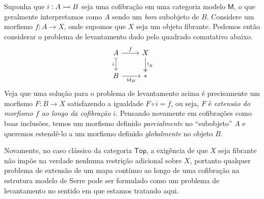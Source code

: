 \begin{exem}
  \label{exem:extensao_ao_longo_de_cofibracao_como_levantamento}
  Suponha que $i: A \rightarrowtail B$ seja uma cofibração em uma categoria modelo $\mathsf{M}$, o que geralmente interpretamos como $A$ sendo um \emph{bom} subobjeto de $B$.
  Considere um morfismo $f: A \to X$, onde supomos que $X$ seja um objeto fibrante.
  Podemos então considerar o problema de levantamento dado pelo quadrado comutativo abaixo.
  \begin{displaymath}
    \begin{tikzcd}
      A
      \arrow[d, tail, "i" swap]
      \arrow[r, "f"]
      & X
      \arrow[d, two heads, "!_{X}"]
      \\ B
      \arrow[r, "\id_{B}" swap]
      & *
    \end{tikzcd}
  \end{displaymath}
  Veja que uma solução para o problema de levantamento acima é precisamente um morfismo $F: B \to X$ satisfazendo a igualdade $F \circ i = f$, ou seja, $F$ é \emph{extensão do morfismo $f$ ao longo da cofibração $i$}.
  Pensando novamente em cofibrações como boas inclusões, temos um morfismo definido \emph{parcialmente} no ``subobjeto'' $A$ e queremos estendê-lo a um morfismo definido \emph{globalmente} no objeto $B$.

  Novamente, no caso clássico da categoria $\mathsf{Top}$, a exigência de que $X$ seja fibrante não impõe na verdade nenhuma restrição adicional sobre $X$, portanto qualquer problema de extensão de um mapa contínuo ao longo de uma cofibração na estrutura modelo de Serre pode ser formulado como um problema de levantamento no sentido em que estamos tratando aqui.
\end{exem}

